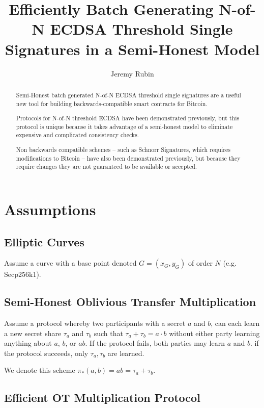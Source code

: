 \documentclass{article}
\author{Jeremy Rubin}
\title{Efficiently Batch Generating N-of-N ECDSA Threshold Single Signatures in a Semi-Honest Model}
\newcommand{\mulOT}{\pi_{*}}
\begin{document}
\maketitle

\begin{abstract}
Semi-Honest batch generated N-of-N ECDSA threshold single signatures are a useful new tool for building backwards-compatible smart contracts for Bitcoin.

Protocols for N-of-N threshold ECDSA have been demonstrated previously, but this protocol is unique because it takes advantage of a semi-honest model to eliminate expensive and complicated consistency checks.

Non backwards compatible schemes -- such as Schnorr Signatures, which requires modifications to Bitcoin -- have also been demonstrated previously, but because they require changes they are not guaranteed to be available or accepted.
\end{abstract}

\section{Assumptions}


\subsection{Elliptic Curves}

Assume a curve with a base point denoted $G = (x_G, y_G)$ of order $N$ (e.g. Secp256k1).



\subsection{Semi-Honest Oblivious Transfer Multiplication}

Assume a protocol whereby two participants with a secret $a$ and $b$, can each learn a new secret share $\tau_a$ and $\tau_b$ such that $\tau_a + \tau_b = a\cdot b$ without either party learning anything about $a$, $b$, or $ab$. If the protocol fails, both parties may learn $a$ and $b$. if the protocol succeeds, only $\tau_a, \tau_b$ are learned.

We denote this scheme $\mulOT(a,b) = ab = \tau_a + \tau_b$. 

\subsection{Efficient OT Multiplication Protocol}
\end{document}
